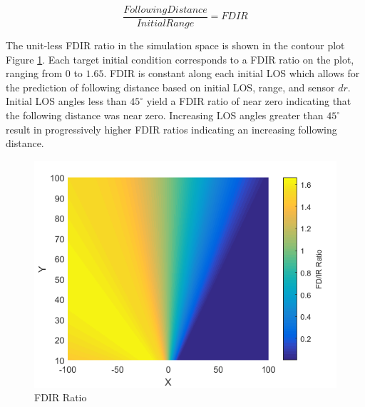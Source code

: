 \documentclass[]{aiaa-tc}%
\begin{document}
\begin{equation} 
\label{eq:FDIR}
\frac{Following Distance}{Initial Range} = FDIR
\end{equation}

The unit-less FDIR ratio in the simulation space is shown in the contour plot Figure \ref{fig:Rays}. Each target initial condition corresponds to a FDIR ratio on the plot, ranging from $0$ to $1.65$. FDIR is constant along each initial LOS which allows for the prediction of following distance based on initial LOS, range, and sensor $dr$. Initial LOS angles less than $45^{\circ}$ yield a FDIR ratio of near zero indicating that the following distance was near zero. Increasing LOS angles greater than $45^{\circ}$ result in progressively higher FDIR ratios indicating an increasing following distance.





\begin{figure}[H]
	\centering
	\includegraphics[width=12 cm]{FDIR_Rays.png}
	\caption{FDIR Ratio}
	\label{fig:Rays}
\end{figure}
\end{document}
